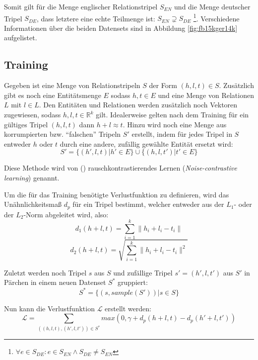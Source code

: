 Somit gilt für die Menge englischer Relationstripel $S_{EN}$ und die Menge deutscher Tripel $S_{DE}$, dass letztere
eine echte Teilmenge ist: $S_{EN} \supsetneq S_{DE}$ \footnote{$\forall e \in S_{DE}: e \in S_{EN} \wedge S_{DE} \neq S_{EN}$}.
Verschiedene Informationen über die beiden Datensets sind in Abbildung \ref{fig:fb15kger14k} aufgelistet.

\subsection{Training}

Gegeben ist eine Menge von Relationstripeln $S$ der Form $(h, l, t) \in S$. Zusätzlich gibt es noch eine Entitätsmenge
$E$ sodass $h, t \in E$ und eine Menge von Relationen $L$ mit $l \in L$. Den Entitäten und Relationen werden zusätzlich
noch Vektoren zugewiesen, sodass $h, l, t \in \mathbb{R}^k$ gilt. Idealerweise gelten nach dem Training für ein gültiges Tripel $(h, l, t)$
dann $h + l \approx t$. Hinzu wird noch eine Menge aus korrumpierten bzw. ``falschen'' Tripeln $S'$ erstellt, indem
für jedes Tripel in $S$ entweder $h$ oder $t$ durch eine andere, zufällig gewählte Entität ersetzt wird:
\begin{equation}
  S' = \{(h', l, t) | h' \in E\} \cup \{(h, l, t') | t' \in E\}
\end{equation}

Diese Methode wird von (\cite{bordes2013translating}) rauschkontrastierendes Lernen (\emph{Noise-contrastive learning})
genannt.

Um die für das Training benötigte Verlustfunktion zu definieren, wird das Unähnlichkeitsmaß $d_p$ für ein Tripel bestimmt, welcher
entweder aus der $L_1$- oder der $L_2$-Norm abgeleitet wird, also:
\begin{equation}
    d_1(h + l, t) = \sum_{i=1}^k \| h_i + l_i - t_i \|
\end{equation}
\begin{equation}
    d_2(h + l, t) = \sqrt{\sum_{i=1}^k \| h_i + l_i - t_i \|^2}
\end{equation}

Zuletzt werden noch Tripel $s$ aus $S$ und zufällige Tripel $s'=(h', l, t')$ aus $S'$ in Pärchen in einem neuen Datenset $S^*$ gruppiert:
\begin{equation}
  S^* = \{(s, sample(S'))| s \in S\}
\end{equation}

Nun kann die Verlustfunktion $\mathcal{L}$ erstellt werden:
\begin{equation}\label{form:lossf}
  \mathcal{L} = \sum_{((h,l,t), (h', l, t')) \in S^*} max(0, \gamma + d_p(h + l, t) - d_p(h' + l, t'))
\end{equation}

